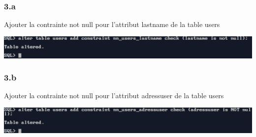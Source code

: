\subsubsection*{3.a}
Ajouter la contrainte not null pour l'attribut lastname de la table users



\begin{center}
    \includegraphics[width=\textwidth]{ScreenShot/Partie2/nn1.png}
\end{center}

\vspace{0.25cm}
\subsubsection*{3.b}
Ajouter la contrainte not null pour l'attribut adressuser de la table users



\begin{center}
    \includegraphics[width=\textwidth]{ScreenShot/Partie2/nn2.png}
\end{center}

